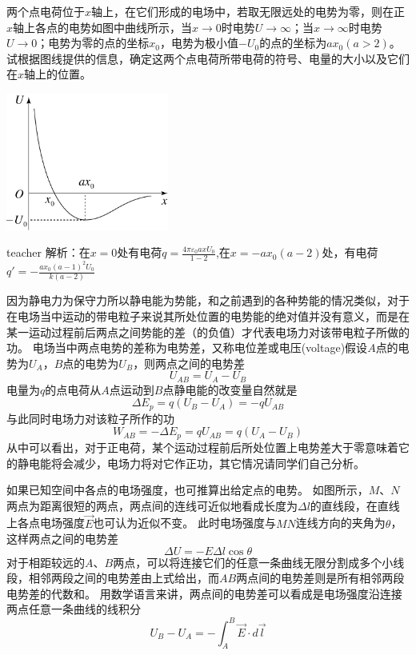 \begin{example}
两个点电荷位于$x$轴上，在它们形成的电场中，若取无限远处的电势为零，则在正$x$轴上各点的电势如图中曲线所示，当$x\rightarrow 0$时电势$U\rightarrow \infty$；当$x\rightarrow \infty$时电势$U\rightarrow 0$；电势为零的点的坐标$x_0$，电势为极小值$-U_0$的点的坐标为$ax_0(a>2)$。
试根据图线提供的信息，确定这两个点电荷所带电荷的符号、电量的大小以及它们在$x$轴上的位置。
\begin{flushright}
\includegraphics[width=0.4\textwidth]{images/elec-problem-11.pdf}
\end{flushright}
\begin{taggedblock}{teacher}
\noindent
解析：在$x=0$处有电荷$q=\frac{4\pi\varepsilon_0axU_0}{1-2}$,在$x=-ax_0(a-2)$处，有电荷$q'=-\frac{ax_0(a-1)^2U_0}{k(a-2)}$
\end{taggedblock}
\end{example}

因为静电力为保守力所以静电能为势能，和之前遇到的各种势能的情况类似，对于在电场当中运动的带电粒子来说其所处位置的电势能的绝对值并没有意义，而是在某一运动过程前后两点之间势能的差（的负值）才代表电场力对该带电粒子所做的功。
电场当中两点电势的差称为{\heiti 电势差}，又称{\heiti 电位差}或{\heiti 电压}(voltage)假设$A$点的电势为$U_A$，$B$点的电势为$U_B$，则两点之间的电势差
\begin{equation}
U_{AB}=U_A-U_B
\end{equation}
电量为$q$的点电荷从$A$点运动到$B$点静电能的改变量自然就是
\begin{equation}
\Delta E_p = q(U_B-U_A) = -qU_{AB}
\end{equation}
与此同时电场力对该粒子所作的功
\begin{equation}
W_{AB} = -\Delta E_p = qU_{AB} = q(U_A-U_B)
\end{equation}
从中可以看出，对于正电荷，某个运动过程前后所处位置上电势差大于零意味着它的静电能将会减少，电场力将对它作正功，其它情况请同学们自己分析。

如果已知空间中各点的电场强度，也可推算出给定点的电势。
如图所示，$M$、$N$两点为距离很短的两点，两点间的连线可近似地看成长度为$\Delta l$的直线段，在直线上各点电场强度$\vec{E}$也可认为近似不变。
此时电场强度与$MN$连线方向的夹角为$\theta$，这样两点之间的电势差
\begin{equation}
\Delta U = -E\Delta l \cos\theta
\end{equation}
对于相距较远的$A、B$两点，可以将连接它们的任意一条曲线无限分割成多个小线段，相邻两段之间的电势差由上式给出，而$AB$两点间的电势差则是所有相邻两段电势差的代数和。
用数学语言来讲，两点间的电势差可以看成是电场强度沿连接两点任意一条曲线的线积分
\[U_B-U_A = -\int_A^B\vec{E}\cdot d\vec{l}\]

